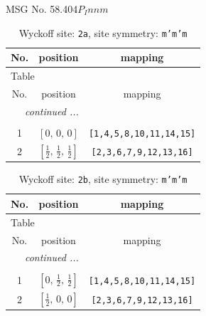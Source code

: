\documentclass[fleqn,8pt]{jsarticle}
\begin{document}
\setcounter{MaxMatrixCols}{32}

\renewcommand{\tablename}{Table~}
\renewcommand{\figurename}{Figure~}
\begin{center}
\LARGE
MSG No. 58.404\quad$P_{I}nnm$
\end{center}
\renewcommand{\arraystretch}{1.2}
\begin{longtable}{ccc}
\caption{Wyckoff site: {\tt 2a}, site symmetry: {\tt m'm'm}}
 \\
 \hline \hline
No. & position & mapping \\ \hline \endfirsthead

\multicolumn{2}{l}{\tablename\ \thetable{}} \\
 \hline \hline
No. & position & mapping \\ \hline \endhead

 \hline \hline
\multicolumn{2}{r}{\footnotesize\it continued ...} \\ \endfoot

 \hline \hline
\multicolumn{2}{r}{} \\ \endlastfoot

1 & $\left[ 0,\, 0,\, 0 \right]$ & {\tt [1,4,5,8,10,11,14,15]} \\ \hline
2 & $\left[ \frac{1}{2},\, \frac{1}{2},\, \frac{1}{2} \right]$ & {\tt [2,3,6,7,9,12,13,16]} \\
\end{longtable}
\renewcommand{\arraystretch}{1.2}
\begin{longtable}{ccc}
\caption{Wyckoff site: {\tt 2b}, site symmetry: {\tt m'm'm}}
 \\
 \hline \hline
No. & position & mapping \\ \hline \endfirsthead

\multicolumn{2}{l}{\tablename\ \thetable{}} \\
 \hline \hline
No. & position & mapping \\ \hline \endhead

 \hline \hline
\multicolumn{2}{r}{\footnotesize\it continued ...} \\ \endfoot

 \hline \hline
\multicolumn{2}{r}{} \\ \endlastfoot

1 & $\left[ 0,\, \frac{1}{2},\, \frac{1}{2} \right]$ & {\tt [1,4,5,8,10,11,14,15]} \\ \hline
2 & $\left[ \frac{1}{2},\, 0,\, 0 \right]$ & {\tt [2,3,6,7,9,12,13,16]} \\
\end{longtable}
\end{document}
